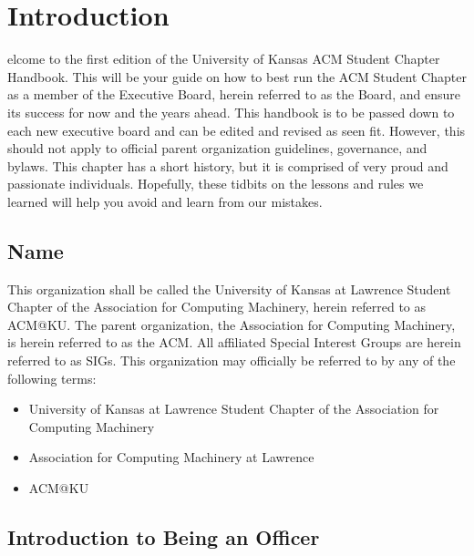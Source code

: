 %
%
\let\textcircled=\pgftextcircled
\chapter{Introduction}
\label{chap:intro}

elcome to the first edition of the University of Kansas ACM Student
Chapter Handbook. This will be your guide on how to best run the ACM Student
Chapter as a member of the Executive Board, herein referred to as the Board, and
ensure its success for now and the years ahead. This handbook is to be passed down
to each new executive board and can be edited and revised as seen fit. However,
this should not apply to official parent organization guidelines, governance,
and bylaws. This chapter has a short history, but it is comprised of very proud
and passionate individuals. Hopefully, these tidbits on the lessons and rules we
learned will help you avoid and learn from our mistakes.

\section{Name}
\label{sec:sec01}

This organization shall be called the University of Kansas at Lawrence Student
Chapter of the Association for Computing Machinery, herein referred to as ACM@KU.
The parent organization, the Association for Computing Machinery, is herein
referred to as the ACM. All affiliated Special Interest Groups are herein
referred to as SIGs. This organization may officially be referred to by any of
the following terms:
\begin{itemize}
	\item University of Kansas at Lawrence Student Chapter of the Association for
				Computing Machinery
	\item Association for Computing Machinery at Lawrence
	\item ACM@KU
\end{itemize}

\section{Introduction to Being an Officer}
\label{sec:sec02}

%

